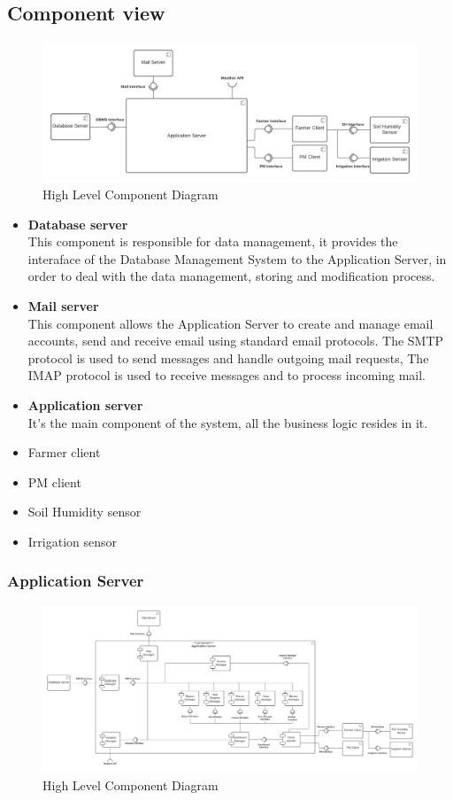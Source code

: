 \documentclass[10pt]{article} %
\begin{document}
\subsection{Component view}
\begin{figure}[h]
    \centering
    \includegraphics[scale=0.5]{images/hl_component.png}
    \caption{High Level Component Diagram}
    \label{fig:hl_component}
\end{figure}
\begin{itemize}
    \item \textbf{Database server}\\This component is responsible for data management, 
    it provides the interaface of the Database Management System to the Application Server, in order to 
    deal with the data management, storing and modification process.
    \item \textbf{Mail server}\\This component allows the Application Server to create and manage email accounts, 
    send and receive email using standard email protocols. The SMTP protocol is used to send messages and handle outgoing mail requests, 
    The IMAP protocol is used to receive messages and to process incoming mail.
    \item \textbf{Application server}\\It's the main component of the system, all the business logic 
    resides in it.
    \item Farmer client
    \item PM client
    \item Soil Humidity sensor
    \item Irrigation sensor
\end{itemize}
\subsubsection{Application Server}
\begin{figure}[h]
    \centering 
    \includegraphics[scale=0.3]{images/app_server_component.png}
    \caption{High Level Component Diagram}
    \label{fig:app_component}
\end{figure}
\end{document}
